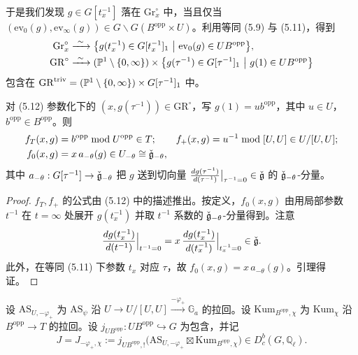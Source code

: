 于是我们发现 $g\in G[t_x^{-1}]$ 落在 $\mathrm{Gr}^\circ_x$ 中，当且仅当 $(\mathrm{ev}_0(g),\mathrm{ev}_\infty(g))\in G\backslash G(B^{\mathrm{opp}}\times U)$。利用等同 (5.9) 与 (5.11)，得到
\begin{equation}
\begin{aligned}
\mathrm{Gr}^\circ_x&\xrightarrow{\ \sim\ }\big\{g(t_x^{-1})\in G[t_x^{-1}]_1\ \big|\ \mathrm{ev}_0(g)\in UB^{\mathrm{opp}}\big\},\\
\mathrm{GR}^\circ&\xrightarrow{\ \sim\ }(\PP^1\setminus\{0,\infty\})\times\big\{g(\tau^{-1})\in G[\tau^{-1}]_1\ \big|\ g(1)\in UB^{\mathrm{opp}}\big\}
\end{aligned}
\end{equation}
包含在 $\mathrm{GR}^{\mathrm{triv}}=(\mathbb{P}^1\setminus\{0,\infty\})\times G[\tau^{-1}]_1$ 中。

\begin{lemma}
对 (5.12) 参数化下的 $(x,g(\tau^{-1}))\in\mathrm{GR}^\circ$，写 $g(1)=ub^{\mathrm{opp}}$，其中 $u\in U$，$b^{\mathrm{opp}}\in B^{\mathrm{opp}}$。则
\[
\begin{aligned}
f_T(x,g)&=b^{\mathrm{opp}}\bmod U^{\mathrm{opp}}\in T;\qquad
f_+(x,g)=u^{-1}\bmod[U,U]\in U/[U,U];\\
f_0(x,g)&=x\,a_{-\theta}(g)\in U_{-\theta}\cong\check{\mathfrak g}_{-\theta},
\end{aligned}
\]
其中 $a_{-\theta}:G[\tau^{-1}]\to\check{\mathfrak g}_{-\theta}$ 把 $g$ 送到切向量 $\frac{dg(\tau^{-1})}{d(\tau^{-1})}\big|_{\tau^{-1}=0}\in\check{\mathfrak g}$ 的 $\check{\mathfrak g}_{-\theta}$-分量。
\end{lemma}

\begin{proof}
$f_T,f_+$ 的公式由 (5.12) 中的描述推出。按定义，$f_0(x,g)$ 由用局部参数 $t^{-1}$ 在 $t=\infty$ 处展开 $g(t_x^{-1})$ 并取 $t^{-1}$ 系数的 $\check{\mathfrak g}_{-\theta}$-分量得到。注意
\[
\frac{dg(t_x^{-1})}{d(t^{-1})}\Big|_{t^{-1}=0}=x\,\frac{dg(t_x^{-1})}{d(t_x^{-1})}\Big|_{t_x^{-1}=0}\in\check{\mathfrak g}.
\]
此外，在等同 (5.11) 下参数 $t_x$ 对应 $\tau$，故 $f_0(x,g)=x\,a_{-\theta}(g)$。引理得证。
\end{proof}

设 $\mathrm{AS}_{U,-\varphi_+}$ 为 $\mathrm{AS}_\psi$ 沿 $U\to U/[U,U]\xrightarrow{-\varphi_+}\mathbb{G}_a$ 的拉回。设 $\mathrm{Kum}_{B^{\mathrm{opp}},\chi}$ 为 $\mathrm{Kum}_\chi$ 沿 $B^{\mathrm{opp}}\to T$ 的拉回。设 $j_{UB^{\mathrm{opp}}}:UB^{\mathrm{opp}}\hookrightarrow G$ 为包含，并记
\[
J=J_{-\varphi_+,\chi}:=j_{UB^{\mathrm{opp}},!}\big(\mathrm{AS}_{U,-\varphi_+}\boxtimes\mathrm{Kum}_{B^{\mathrm{opp}},\chi}\big)\in D^b_c(G,\mathbb{Q}_\ell).
\]

